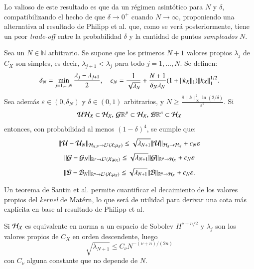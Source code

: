 Lo valioso de este resultado es que da un régimen asintótico para $N$ y $\delta$, compatibilizando el hecho de que $\delta \to 0^+$ cuando $N \to \infty$, proponiendo una alternativa al resultado de Philipp et al. que, como se verá posteriormente, tiene un peor \textit{trade-off} entre la probabilidad $\delta$ y la cantidad de puntos \textit{sampleados} $N$.

\begin{teo}
    Sea un \( N \in \mathbb{N} \) arbitrario. Se supone que los primeros \( N + 1 \) valores propios \( \lambda_j \) de \( C_X \) son simples, es decir, \( \lambda_{j+1} < \lambda_j \) para todo \( j = 1, \ldots, N \). Se definen:
    \[
    \delta_N = \min_{j=1, \ldots, N} \frac{\lambda_j - \lambda_{j+1}}{2}, \quad c_N = \frac{1}{\sqrt{\lambda_N}} + \frac{N + 1}{\delta_N \lambda_N} (1 + \|k_{\mathcal{X}}\|_{1}) \|k_{\mathcal{X}} \|^{1/2}_{1}.
    \]
    Sea además \( \varepsilon \in (0, \delta_N) \) y \( \delta \in (0, 1) \) arbitrarios, y \( N \geq  \frac{8\|k\|^2_\infty \ln(2/\delta)}{\varepsilon^2} \). Si 
    \begin{equation*}
        \mathcal{U} \mathcal{H}_{\mathcal{X}} \subset \mathcal{H}_{\mathcal{X}}, \, \mathcal{G} \mathbb{R}^p \subset \mathcal{H}_{\mathcal{X}}, \, \mathcal{B} \mathbb{R}^n \subset \mathcal{H}_{\mathcal{X}}
    \end{equation*}
    entonces, con probabilidad al menos \( (1 - \delta)^4 \), se cumple que:
    \[
    \|\mathcal{U} - \mathcal{U}_N \|_{\mathcal{H}_{\mathcal{X}, N} \to L^2(\mathcal{X}; \mu_{\mathcal{X}})} \leq \sqrt{\lambda_{N+1}} \|\mathcal{U} \|_{\mathcal{H}_{X} \to \mathcal{H_{\mathcal{X}}}} + c_N \varepsilon
    \]
    \[
    \|\mathcal{G} - \mathcal{G}_N \|_{\mathbb{R}^p \to L^2(\mathcal{X}; \mu_{\mathcal{X}})} \leq \sqrt{\lambda_{N+1}} \|\mathcal{G} \|_{\mathbb{R}^p \to \mathcal{H_{\mathcal{X}}}} + c_N \varepsilon
    \]
    \[
    \|\mathcal{B} - \mathcal{B}_N \|_{\mathbb{R}^n \to L^2(\mathcal{X}; \mu_{\mathcal{X}})} \leq \sqrt{\lambda_{N+1}} \|\mathcal{B} \|_{\mathbb{R}^n \to \mathcal{H_{\mathcal{X}}}} + c_N \varepsilon.
    \]
    \label{teo:error_koop}
\end{teo}

Un teorema de Santin et al. permite cuantificar el decaimiento de los valores propios del \textit{kernel} de Matérn, lo que será de utilidad para derivar una cota más explícita en base al resultado de Philipp et al. 

\begin{teo}
    Si $\mathcal{H}_{\mathcal{X}}$ es equivalente en norma a un espacio de Sobolev $H^{\nu + n/2}$ y $\lambda_j$ son los valores propios de $C_X$ en orden descendente, luego
    \begin{equation*}
        \sqrt{\lambda_{N+1}} \leq C_\nu N^{-(\nu + n)/(2n)}
    \end{equation*}
    con $C_\nu$ alguna constante que no depende de $N$.
    \label{teo:eig_val_decay}
\end{teo}

